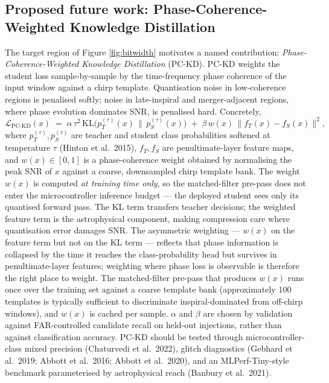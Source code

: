 \documentclass[11pt,a4paper]{article}
\begin{document}
\subsection{Proposed future work: Phase-Coherence-Weighted Knowledge Distillation}
The target region of Figure \ref{fig:bitwidth} motivates a named contribution: \textit{Phase-Coherence-Weighted Knowledge Distillation} (PC-KD). PC-KD weights the student loss sample-by-sample by the time-frequency phase coherence of the input window against a chirp template. Quantisation noise in low-coherence regions is penalised softly; noise in late-inspiral and merger-adjacent regions, where phase evolution dominates SNR, is penalised hard. Concretely,
\begin{equation}
\mathcal{L}_{\text{PC-KD}}(x) \;=\; \alpha \, \tau^2 \, \mathrm{KL}\!\big( p_T^{(\tau)}(x) \,\|\, p_S^{(\tau)}(x) \big) \;+\; \beta \, w(x) \, \big\| f_T(x) - f_S(x) \big\|^2,
\label{eq:pckd}
\end{equation}
where $p_T^{(\tau)}, p_S^{(\tau)}$ are teacher and student class probabilities softened at temperature $\tau$ (Hinton et al.\ 2015), $f_T, f_S$ are penultimate-layer feature maps, and $w(x) \in [0,1]$ is a phase-coherence weight obtained by normalising the peak SNR of $x$ against a coarse, downsampled chirp template bank. The weight $w(x)$ is computed \textit{at training time only}, so the matched-filter pre-pass does not enter the microcontroller inference budget — the deployed student sees only its quantised forward pass. The KL term transfers teacher decisions; the weighted feature term is the astrophysical component, making compression care where quantisation error damages SNR. The asymmetric weighting — $w(x)$ on the feature term but not on the KL term — reflects that phase information is collapsed by the time it reaches the class-probability head but survives in penultimate-layer features; weighting where phase loss is observable is therefore the right place to weight. The matched-filter pre-pass that produces $w(x)$ runs once over the training set against a coarse template bank (approximately 100 templates is typically sufficient to discriminate inspiral-dominated from off-chirp windows), and $w(x)$ is cached per sample. $\alpha$ and $\beta$ are chosen by validation against FAR-controlled candidate recall on held-out injections, rather than against classification accuracy. PC-KD should be tested through microcontroller-class mixed precision (Chaturvedi et al.\ 2022), glitch diagnostics (Gebhard et al.\ 2019; Abbott et al.\ 2016; Abbott et al.\ 2020), and an MLPerf-Tiny-style benchmark parameterised by astrophysical reach (Banbury et al.\ 2021).
\end{document}
